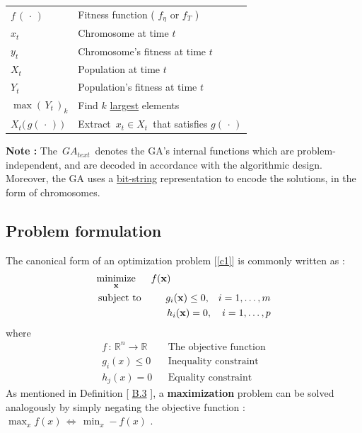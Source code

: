 \documentclass[12pt]{article}
\numberwithin{equation}{section}
\begin{document}
\begin{flushleft}
\begin{tabular}{ p{2.5 cm} p{12cm}}
$f  \,( \, \cdot \, )$ & Fitness function ( $f_{\eta}$ or $f_T$ ) \\
$x_t$ & Chromosome at time $t$ \\
$y_t$ & Chromosome's fitness at time $t$ \\
$X_t$ & Population at time $t$ \\
$Y_t$ & Population's fitness at time $t$ \\
$\max(\, Y_t \, )_{k}$ & Find $k$ \underline{largest} elements \\
$X_t \big(\, g( \, \cdot \, ) \, \big)$ & Extract \,$x_t \in X_t$\, that satisfies $ g( \, \cdot \, )$ \\
\end{tabular} %

\textbf{Note :} The\, $GA_{text}$\, denotes the GA's internal functions which are problem-independent, and are decoded in accordance with the algorithmic design. Moreover, the GA uses a \underline{bit-string} representation to encode the solutions, in the form of chromosomes.

\subsection{Problem formulation}
The canonical form of an optimization problem [\ref{c1}] is commonly written as :
\begin{align}
&\underset{\mathbf{x}}{\operatorname{minimize}} & f(\mathbf{x}) \label{f_opt}\hspace{35.5mm} \\
&\operatorname{subject \ to}
& g_i(\mathbf{x}) \leq 0, \hspace{3mm} i = 1, \dots, m  \label{Inequality} \\
&& h_i(\mathbf{x}) = 0, \quad i = 1, \dots, p  \label{Equality} 
\end{align}
where
\begin{align*}
f\, : \, \mathbb{R}^n \rightarrow \mathbb{R} & & \text{The objective function} \\
g_i(x) \leq 0 & & \text{Inequality constraint} \\
h_j(x) = 0 & & \text{Equality constraint}
\end{align*}
As mentioned in Definition [ \hyperlink{convex_concave}{B.3} ], a \textbf{maximization} problem can be solved analogously by simply negating the objective function : \,$\max_x f(x) \, \Leftrightarrow \, \min_x -f(x) $ . %


\end{flushleft}
\end{document}
